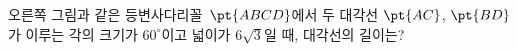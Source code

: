 \noindent\begin{minipage}[t]{0.58\linewidth}\vspace{0pt}\raggedright 오른쪽 그림과 같은 등변사다리꼴~$\pt{ABCD}$에서 두 대각선 $\pt{AC}$, $\pt{BD}$가 이루는 각의 크기가 $60^\circ$이고 넓이가 $6\sqrt{3}$일 때, 대각선의 길이는?\end{minipage}\hfill\begin{minipage}[t]{0.4\linewidth}\vspace{0pt}\centering \resizebox{\ifdim\width>\linewidth\linewidth\else\width\fi}{!}{}\end{minipage}\par
{}
